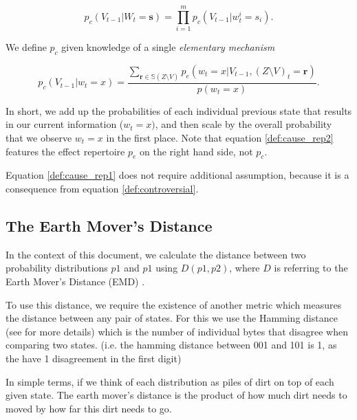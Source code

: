 \begin{equation}
\label{def:cause_rep1}
p_c(V_{t-1} | W_t=\mathbf{s}) = \prod \limits_{i = 1}^{m} p_c(V_{t-1}|w^i_{t} = s_i).
\end{equation}

We define $p_c$ given knowledge of a single \textit{elementary mechanism}

\begin{equation}
\label{def:cause_rep2}
p_c(V_{t-1}| w_t = x) = \frac{\sum \limits_{\mathbf{r} \in \mathbb{S}(Z\setminus V)} p_e(w_t = x| V_{t-1}, (Z \setminus V)_t = \mathbf{r})}{p(w_t = x)}.
\end{equation}

In short, we add up the probabilities of each individual previous state that results in our current information ($w_t = x)$, and then scale by the overall probability that we observe $w_t = x$ in the first place. Note that equation \ref{def:cause_rep2} features the effect repertoire $p_e$ on the right hand side, not $p_c$.

\begin{remark}
	Equation \ref{def:cause_rep1} does not require additional assumption, because it is a consequence from equation \ref{def:controversial}.
\end{remark}



\subsection{The Earth Mover's Distance }
In the context of this document, we calculate the distance between two probability distributions $p1$ and $p1$ using $D(p1,p2)$, where $D$ is referring to the Earth Mover's Distance (EMD) \cite{rubner1998metric}.

To use this distance, we require the existence of another metric which measures the distance between any pair of states. For this we use the Hamming distance (see \cite{hill1986first} for more details) which is the number of individual bytes that disagree when comparing two states. (i.e. the hamming distance between 001 and 101 is 1, as the have 1 disagreement in the first digit)

In simple terms, if we think of each distribution as piles of dirt on top of each given state. The earth mover's distance is the product of how much dirt needs to moved by how far this dirt needs to go. 

